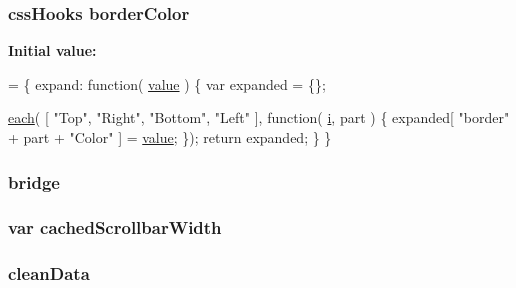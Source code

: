 \hypertarget{jquery-ui_8js_ab79709d3661998618c7aedb82c946095}{
\subsubsection[{border\+Color}]{ css\+Hooks border\+Color}}\label{jquery-ui_8js_ab79709d3661998618c7aedb82c946095}
{\bfseries Initial value\+:}
\begin{DoxyCode}
= \{
    expand: \textcolor{keyword}{function}( \hyperlink{fullpage_2plugin_8min_8js_ac56c57897e10f699d124e0103921aa20}{value} ) \{
        var expanded = \{\};

        \hyperlink{jquery-ui_8js_ae1dde89fbcda3fabf0339b83918f7e08}{each}( [ \textcolor{stringliteral}{"Top"}, \textcolor{stringliteral}{"Right"}, \textcolor{stringliteral}{"Bottom"}, \textcolor{stringliteral}{"Left"} ], \textcolor{keyword}{function}( \hyperlink{core_8constructor_8js_a5e25b1d1bed9ab5f3174b76d6a722180}{i}, part ) \{
            expanded[ \textcolor{stringliteral}{"border"} + part + \textcolor{stringliteral}{"Color"} ] = \hyperlink{fullpage_2plugin_8min_8js_ac56c57897e10f699d124e0103921aa20}{value};
        \});
        \textcolor{keywordflow}{return} expanded;
    \}
\}
\end{DoxyCode}
\hypertarget{jquery-ui_8js_a8b5680c375ebc550c53429eb461391ac}{
\subsubsection[{bridge}]{ bridge}}\label{jquery-ui_8js_a8b5680c375ebc550c53429eb461391ac}
\hypertarget{jquery-ui_8js_a63736fd84c0e2a12a73c4e1911271939}{
\subsubsection[{cached\+Scrollbar\+Width}]{\setlength{\rightskip}{0pt plus 5cm}var cached\+Scrollbar\+Width}}\label{jquery-ui_8js_a63736fd84c0e2a12a73c4e1911271939}
\hypertarget{jquery-ui_8js_a4d80c5737711144fedbc444c477b4ae1}{
\subsubsection[{clean\+Data}]{\setlength{\rightskip}{0pt plus 5cm}clean\+Data}}\label{jquery-ui_8js_a4d80c5737711144fedbc444c477b4ae1}
